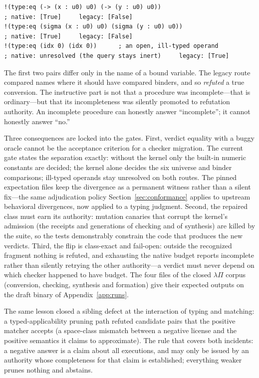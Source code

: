 \documentclass[11pt]{article}
\begin{document}
\begin{verbatim}
!(type:eq (-> (x : u0) u0) (-> (y : u0) u0))
; native: [True]     legacy: [False]
!(type:eq (sigma (x : u0) u0) (sigma (y : u0) u0))
; native: [True]     legacy: [False]
!(type:eq (idx 0) (idx 0))      ; an open, ill-typed operand
; native: unresolved (the query stays inert)     legacy: [True]
\end{verbatim}

\noindent
The first two pairs differ only in the name of a bound variable.  The legacy
route compared names where it should have compared binders, and so
\emph{refuted} a true conversion.  The instructive part is not that a
procedure was incomplete---that is ordinary---but that its incompleteness
was silently promoted to refutation authority.  An incomplete procedure can
honestly answer ``incomplete''; it cannot honestly answer ``no.''

Three consequences are locked into the gates.  First, verdict equality
with a buggy oracle cannot be the acceptance criterion for a checker
migration.  The current gate states the separation exactly: without the
kernel only the built-in numeric constants are decided; the kernel alone
decides the six universe and binder comparisons; ill-typed operands stay
unresolved on both routes.  The pinned expectation files keep the
divergence as a permanent witness rather than a silent fix---the same
adjudication policy Section~\ref{sec:conformance} applies to upstream
behavioral divergences, now applied to a typing judgment.  Second, the
repaired class must earn its authority: mutation canaries that corrupt the
kernel's admission (the receipts and generations of checking and of
synthesis) are killed by the suite, so the tests demonstrably constrain the
code that produces the new verdicts.  Third, the flip is class-exact and
fail-open: outside the recognized fragment nothing is refuted, and
exhausting the native budget reports incomplete rather than silently
retrying the other authority---a verdict must never depend on which
checker happened to have budget.  The four files of the closed
$\lambda\Pi$ corpus (conversion, checking, synthesis and formation) give
their expected outputs on the draft binary of Appendix~\ref{app:runs}.

The same lesson closed a sibling defect at the interaction of typing
and matching: a typed-applicability pruning path refuted
candidate pairs that the positive matcher accepts (a space-class
mismatch between a negative license and the positive semantics it
claims to approximate).  The rule that covers both incidents: a
negative answer is a claim about all executions, and may only be issued
by an authority whose completeness for that claim is established;
everything weaker prunes nothing and abstains.
\end{document}
